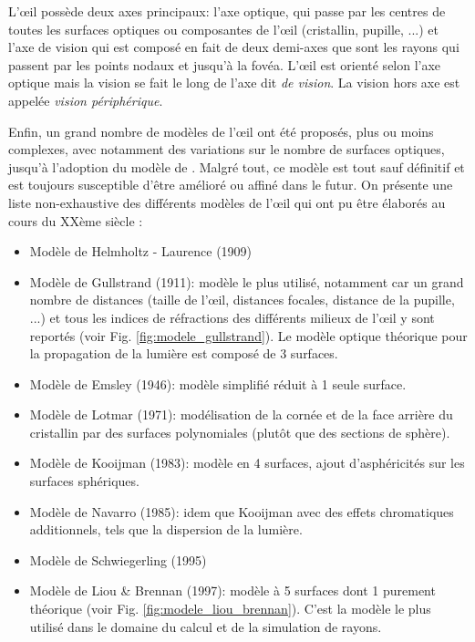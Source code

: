 	\par L'œil possède deux axes principaux: l'axe optique, qui passe par les centres de toutes les surfaces optiques ou composantes de l'œil (cristallin, pupille, ...) et l'axe de vision qui est composé en fait de deux demi-axes que sont les rayons qui passent par les points nodaux et jusqu'à la fovéa. L'œil est orienté selon l'axe optique mais la vision se fait le long de l'axe dit \textit{de vision}. La vision hors axe est appelée \textit{vision périphérique}.
	
	\par Enfin, un grand nombre de modèles de l'œil ont été proposés, plus ou moins complexes, avec notamment des variations sur le nombre de surfaces optiques, jusqu'à l'adoption du modèle de \citep{liou_anatomically_1997}. Malgré tout, ce modèle est tout sauf définitif et est toujours susceptible d'être amélioré ou affiné dans le futur. On présente une liste non-exhaustive des différents modèles de l'œil qui ont pu être élaborés au cours du XXème siècle \citep{liou_anatomically_1997,gross_human_2008}:
	\begin{itemize}
		\item Modèle de Helmholtz - Laurence (1909)
		\item Modèle de Gullstrand (1911): modèle le plus utilisé, notamment car un grand nombre de distances (taille de l'œil, distances focales, distance de la pupille, ...) et tous les indices de réfractions des différents milieux de l'œil y sont reportés (voir Fig. \ref{fig:modele_gullstrand}). Le modèle optique théorique pour la propagation de la lumière est composé de 3 surfaces.
		\item Modèle de Emsley (1946): modèle simplifié réduit à 1 seule surface.
		\item Modèle de Lotmar (1971): modélisation de la cornée et de la face arrière du cristallin par des surfaces polynomiales (plutôt que des sections de sphère).
		\item Modèle de Kooijman (1983): modèle en 4 surfaces, ajout d'asphéricités sur les surfaces sphériques.
		\item Modèle de Navarro (1985): idem que Kooijman avec des effets chromatiques additionnels, tels que la dispersion de la lumière.
		\item Modèle de Schwiegerling (1995)
		\item Modèle de Liou \& Brennan (1997): modèle à 5 surfaces dont 1 purement théorique (voir Fig. \ref{fig:modele_liou_brennan}). C'est la modèle le plus utilisé dans le domaine du calcul et de la simulation de rayons. 
	\end{itemize}
	
